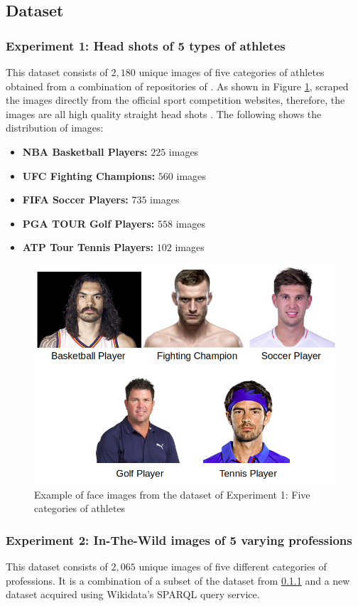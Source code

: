 \documentclass[12pt,english]{article}
\begin{document}
\subsection{Dataset}

\subsubsection{Experiment 1: Head shots of 5 types of athletes}
\label{experiment1}
\quad
This dataset consists of $2,180$ unique images of five categories of athletes obtained from a combination of repositories of \cite{data1}. As shown in Figure \ref{fig:sport}, \cite{data1} scraped the images directly from the official sport competition websites, therefore, the images are all high quality straight head shots \cite{data1}. The following shows the distribution of images:

\begin{itemize}
\item \textbf{NBA Basketball Players: } $225$ images
\item \textbf{UFC Fighting Champions: } $560$ images
\item \textbf{FIFA Soccer Players: } $735$ images
\item \textbf{PGA TOUR Golf Players: } $558$ images
\item \textbf{ATP Tour Tennis Players: } $102$ images
\end{itemize}


\begin{figure}[!tbp]
 \centering
    \includegraphics[width=0.7\columnwidth]{figures/ex1.png}
    \caption{Example of face images from the dataset of Experiment 1: Five categories of athletes \cite{data1}}
	\label{fig:sport}
\end{figure}

\subsubsection{Experiment 2: In-The-Wild images of 5 varying professions}
\label{experiment2}
\quad
This dataset consists of $2,065$ unique images of five different categories of professions. It is a combination of a subset of the dataset from \ref{experiment1} and a new dataset acquired using Wikidata's SPARQL query service. 
\end{document}
